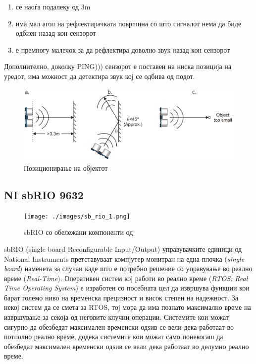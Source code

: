\documentclass[11pt]{article}
\begin{document}
      \renewcommand{\theenumi}{\alph{enumi}}
      \begin{enumerate}
        \item се наоѓа подалеку од 3m
        \item има мал агол на рефлектирачката површина со што сигналот нема да биде одбиен назад кон сензорот
        \item е премногу малечок за да рефлектира доволно звук назад кон сензорот
        \end{enumerate}

		  Дополнително, доколку PING))) сензорот е поставен на ниска позиција на уредот, има можност да детектира звук кој се одбива од подот.

      \begin{figure}[h]
        \includegraphics[width=0.75\linewidth]{./images/ping_obj.png}
        \centering
        \caption{Позиционирање на објектот}
        \label{fig:ping_obj.png}
        \end{figure}

  \subsection{NI sbRIO 9632}
	  \begin{figure}[h]
		  \centering
		  \texttt{[image: ./images/sb\_rio\_1.png]}
		  \caption{sbRIO со обележани компоненти од \cite{experiments}}
		  \label{fig:sb_rio_1.png}
		  \end{figure}

    sbRIO (single-board Reconfigurable Input/Output) управувачките единици од National Instruments претставуваат компјутер монитран на една плочка (\textit{single board}) наменета за случаи каде што е потребно решение со управување во реално време (\textit{Real-Time}). Оперативен систем кој работи во реално време (\textit{RTOS: Real Time Operating System}) е изработен со посебната цел да извршува функции кои барат големо ниво на временска прецизност и висок степен на надежност. За некој систем да се смета за RTOS, тој мора да има познато максимално време на извршување за секоја од неговите клучни операции. Системите кои можат сигурно да обезбедат максимален временски одѕив се вели дека работаат во потполно реално време, додека системите кои можат само понекогаш да обезбедат максимален временски одѕив се вели дека работаат во делумно реално време.
\end{document}
